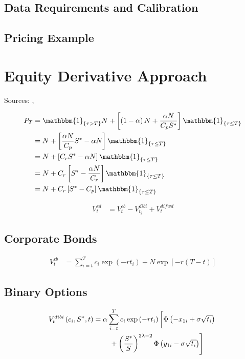 \subsection{Data Requirements and Calibration}

\subsection{Pricing Example}

\section{Equity Derivative Approach}
Sources: \cite{erismann2015pricing}, \cite{de2011pricing}

\begin{align}
    P_T &= \mathbbm{1}_{\{ \tau > T \}} N +\left[ \left( 1 - \alpha \right) N + \dfrac{\alpha N}{C_p S^*} \right] \mathbbm{1}_{\{ \tau \leq T \}}\nonumber\\
    &= N + \left[ \dfrac{\alpha N}{C_p} S^* - \alpha N \right] \mathbbm{1}_{\{ \tau \leq T \}}\nonumber\\
    &= N + \left[ C_r S^* - \alpha N \right] \mathbbm{1}_{\{ \tau \leq T \}}\nonumber\\
    &= N + C_r \left[S^* - \dfrac{\alpha N}{C_r}\right] \mathbbm{1}_{\{ \tau \leq T \}}\nonumber\\
    &= N + C_r \left[ S^* - C_p \right] \mathbbm{1}_{\{ \tau \leq T \}}\nonumber
\end{align}

\begin{align}
    V^{ed}_t &= V^{cb}_t - V_{t_i}^{dibi} + V_t^{difwd}
\end{align}

\subsection{Corporate Bonds}
\begin{align}
    V^{cb}_t &= \sum^T_{i=t}c_i \exp\left(-r t_i\right) + N \exp\left[-r\left(T-t\right)\right]
\end{align}

\subsection{Binary Options}

\begin{align}
    V_t^{dibi}\left( c_i, S^*, t \right) &= \alpha \sum^T_{i=t}c_i \exp\left(-r t_i\right) \left[ \Phi\left(-x_{1i} + \sigma \sqrt{t_i}\right)\vphantom{\dfrac{S^*}{S}}\right.\nonumber\\
   &\qquad \left.\vphantom{\dfrac{S^*}{S}} +\left(\dfrac{S^*}{S}\right)^{2\lambda -2} \Phi\left(y_{1i} - \sigma \sqrt{t_i}\right) \right]
\end{align}

